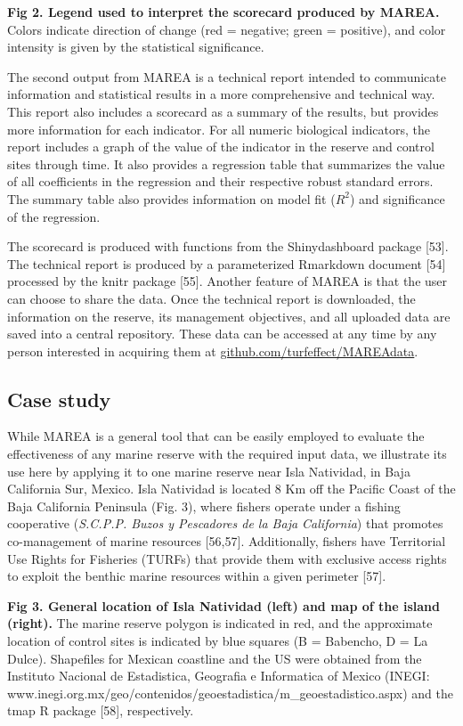 \documentclass[12pt,]{article}
\begin{document}
\textbf{Fig 2. Legend used to interpret the scorecard produced by
MAREA.} Colors indicate direction of change (red = negative; green =
positive), and color intensity is given by the statistical significance.

The second output from MAREA is a technical report intended to
communicate information and statistical results in a more comprehensive
and technical way. This report also includes a scorecard as a summary of
the results, but provides more information for each indicator. For all
numeric biological indicators, the report includes a graph of the value
of the indicator in the reserve and control sites through time. It also
provides a regression table that summarizes the value of all
coefficients in the regression and their respective robust standard
errors. The summary table also provides information on model fit
(\(R^2\)) and significance of the regression.

The scorecard is produced with functions from the Shinydashboard package
{[}53{]}. The technical report is produced by a parameterized Rmarkdown
document {[}54{]} processed by the knitr package {[}55{]}. Another
feature of MAREA is that the user can choose to share the data. Once the
technical report is downloaded, the information on the reserve, its
management objectives, and all uploaded data are saved into a central
repository. These data can be accessed at any time by any person
interested in acquiring them at \url{github.com/turfeffect/MAREAdata}.

\subsection{Case study}\label{case-study}

While MAREA is a general tool that can be easily employed to evaluate
the effectiveness of any marine reserve with the required input data, we
illustrate its use here by applying it to one marine reserve near Isla
Natividad, in Baja California Sur, Mexico. Isla Natividad is located 8
Km off the Pacific Coast of the Baja California Peninsula (Fig. 3),
where fishers operate under a fishing cooperative (\emph{S.C.P.P. Buzos
y Pescadores de la Baja California}) that promotes co-management of
marine resources {[}56,57{]}. Additionally, fishers have Territorial Use
Rights for Fisheries (TURFs) that provide them with exclusive access
rights to exploit the benthic marine resources within a given perimeter
{[}57{]}.

\textbf{Fig 3. General location of Isla Natividad (left) and map of the
island (right).} The marine reserve polygon is indicated in red, and the
approximate location of control sites is indicated by blue squares (B =
Babencho, D = La Dulce). Shapefiles for Mexican coastline and the US
were obtained from the Instituto Nacional de Estadistica, Geografia e
Informatica of Mexico (INEGI:
www.inegi.org.mx/geo/contenidos/geoestadistica/m\_geoestadistico.aspx)
and the tmap R package {[}58{]}, respectively.
\end{document}
